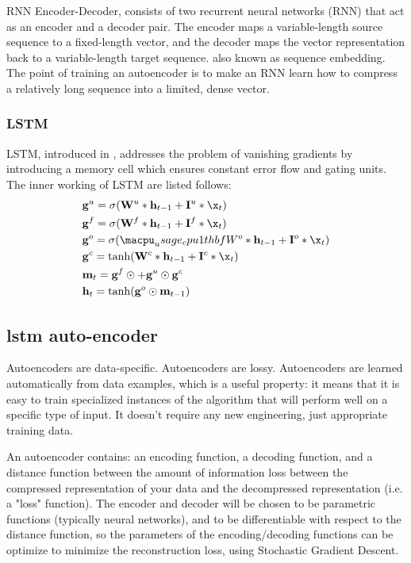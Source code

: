 \documentclass[review]{elsarticle}
\begin{document}
RNN Encoder-Decoder, consists of two recurrent neural networks (RNN) that act as an encoder and a decoder pair. The encoder maps a variable-length source sequence to a fixed-length vector, and the decoder maps the vector representation back to a variable-length target sequence. \cite{ChoLearningTranslation} also known as sequence embedding. The point of training an autoencoder is to make an RNN learn how to compress a relatively long sequence into a limited, dense vector.

\subsubsection{LSTM}
LSTM, introduced in \cite{Hochreiter1997LongMemory}, addresses the problem of vanishing gradients by introducing a memory cell which ensures constant error flow and gating units. The inner working of LSTM are listed follows:
\begin{equation}
	\begin{split}
		& \mathbf g^u = \sigma(\mathbf W^u * \mathbf h_{t-1} + \mathbf I^u * \x_t) \\
		& \mathbf g^f = \sigma(\mathbf W^f * \mathbf h_{t-1} + \mathbf I^f * \x_t) \\
		& \mathbf g^o = \sigma(\macpu_usage_cpu1thbf W^o * \mathbf h_{t-1} + \mathbf I^o * \x_t) \\
		& \mathbf g^c = \tanh(\mathbf W^c * \mathbf h_{t-1} + \mathbf I^c * \x_t) \\
		& \mathbf m_t = \mathbf g^f \odot \mathbf +  \mathbf g^u \odot \mathbf g^c \\
		& \mathbf h_t = \tanh(\mathbf g^o \odot \mathbf m_{t-1})
	\end{split}
\end{equation}


\subsection{lstm auto-encoder}
Autoencoders are data-specific. Autoencoders are lossy. Autoencoders are learned automatically from data examples, which is a useful property: it means that it is easy to train specialized instances of the algorithm that will perform well on a specific type of input. It doesn't require any new engineering, just appropriate training data. \cite{BuildingKeras}

An autoencoder contains: an encoding function, a decoding function, and a distance function between the amount of information loss between the compressed representation of your data and the decompressed representation (i.e. a "loss" function). The encoder and decoder will be chosen to be parametric functions (typically neural networks), and to be differentiable with respect to the distance function, so the parameters of the encoding/decoding functions can be optimize to minimize the reconstruction loss, using Stochastic Gradient Descent. 
\end{document}
